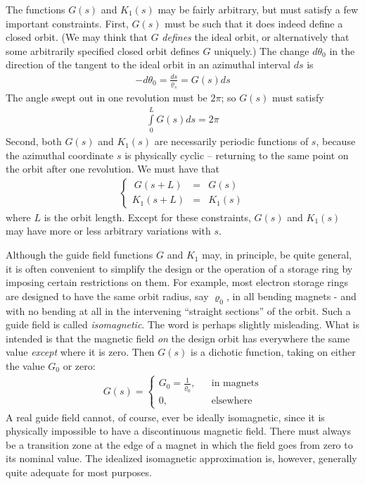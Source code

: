 The functions $G(s)$ and $K_1(s)$ may be fairly arbitrary, but must satisfy a few important constraints. First, $G(s)$ must be such that it does indeed define a closed orbit. (We may think that $G$ \textit{defines} the ideal orbit, or alternatively that some arbitrarily specified closed orbit defines $G$ uniquely.) The change $d\theta_0$ in the direction of the tangent to the ideal orbit in an azimuthal interval $ds$ is
\begin{align}
	-d\theta_0 = \frac{ds}{\varrho_s} = G(s)ds
\end{align}
The angle swept out in one revolution must be $2\pi$; so $G(s)$ must satisfy
\begin{align}
	\int\limits_{0}^{L} G(s)ds = 2\pi
\end{align}
Second, both $G(s)$ and $K_1(s)$ are necessarily periodic functions of $s$, because the azimuthal coordinate $s$ is physically cyclic -- returning to the same point on the orbit after one revolution. We must have that
\begin{align}
	\left\{\begin{array}{rcl}
	\ G(s+L) & = & G(s)\\
	K_1(s+L) & = & K_1(s)
	\end{array}\right.
\end{align}
where $L$ is the orbit length. Except for these constraints, $G(s)$ and $K_1(s)$ may have more or less arbitrary variations with $s$.

Although the guide field functions $G$ and $K_1$ may, in principle, be quite general, it is often convenient to simplify the design or the operation of a storage ring by imposing certain restrictions on them. For example, most electron storage rings are designed to have the same orbit radius, say $\varrho_0$, in all bending magnets - and with no bending at all in the intervening “straight sections” of the orbit. Such a guide field is called \textit{isomagnetic}. The word is perhaps slightly misleading. What is intended is that the magnetic field \textit{on} the design orbit has everywhere the same value \textit{except} where it is zero. Then $G(s)$ is a dichotic function, taking on either the value $G_0$ or zero:
\begin{align}\label{eq:2.9}
	G(s) = \left\{\begin{array}{rrrr}
	G_0 = \frac{1}{\varrho_0}, &&  \text{in magnets}\\
	0, && \text{elsewhere}
	\end{array}\right.
\end{align}
A real guide field cannot, of course, ever be ideally isomagnetic, since it is physically impossible to have a discontinuous magnetic field. There must always be a transition zone at the edge of a magnet in which the field goes from zero to its nominal value. The idealized isomagnetic approximation is, however, generally quite adequate for most purposes.

